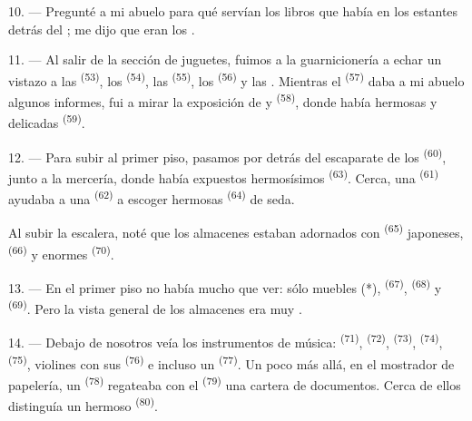 10. --- Pregunté a mi abuelo para qué servían los libros que había en los
estantes detrás del ; me dijo que eran los
.

\VUsaut{3.6mm}
\VUsaut{2.8mm}

11. --- Al salir de la sección de juguetes, fuimos a la guarnicionería a
echar un vistazo a las  \textsuperscript{(53)}, los
 \textsuperscript{(54)}, las  \textsuperscript{(55)}, los
 \textsuperscript{(56)} y las . Mientras el
 \textsuperscript{(57)} daba a mi abuelo algunos informes, fui
a mirar la exposición de  y 
\textsuperscript{(58)}, donde había hermosas  y delicadas
 \textsuperscript{(59)}.

12. --- Para subir al primer piso, pasamos por detrás del escaparate de los
 \textsuperscript{(60)}, junto a la mercería, donde había expuestos
hermosísimos  \textsuperscript{(63)}. Cerca, una
 \textsuperscript{(61)} ayudaba a una 
\textsuperscript{(62)} a escoger hermosas  \textsuperscript{(64)} de seda.

Al subir la escalera, noté que los almacenes estaban adornados con
 \textsuperscript{(65)} japoneses, 
\textsuperscript{(66)} y enormes  \textsuperscript{(70)}.

13. --- En el primer piso no había mucho que ver: sólo muebles (*),
 \textsuperscript{(67)},  \textsuperscript{(68)} y
 \textsuperscript{(69)}. Pero la vista general de los
almacenes era muy .

14. --- Debajo de nosotros veía los instrumentos de música: 
\textsuperscript{(71)},  \textsuperscript{(72)}, 
\textsuperscript{(73)},  \textsuperscript{(74)}, 
\textsuperscript{(75)}, violines con sus  \textsuperscript{(76)} e incluso un
 \textsuperscript{(77)}. Un poco más allá, en el mostrador de
papelería, un  \textsuperscript{(78)} regateaba con el
 \textsuperscript{(79)} una cartera de documentos. Cerca de ellos
distinguía un hermoso  \textsuperscript{(80)}.

